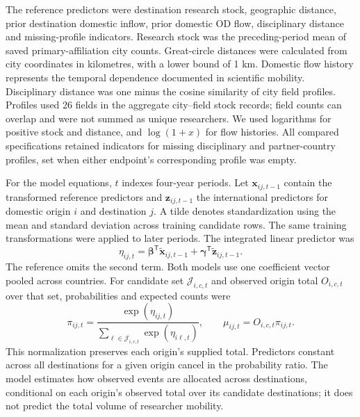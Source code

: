 The reference predictors were destination research stock, geographic distance, prior destination domestic inflow, prior domestic OD flow, disciplinary distance and missing-profile indicators. Research stock was the preceding-period mean of saved primary-affiliation city counts. Great-circle distances were calculated from city coordinates in kilometres, with a lower bound of 1 km. Domestic flow history represents the temporal dependence documented in scientific mobility\cite{ref027}. Disciplinary distance was one minus the cosine similarity of city field profiles. Profiles used 26 fields in the aggregate city--field stock records; field counts can overlap and were not summed as unique researchers. We used logarithms for positive stock and distance, and $\log(1+x)$ for flow histories. All compared specifications retained indicators for missing disciplinary and partner-country profiles, set when either endpoint's corresponding profile was empty.

For the model equations, $t$ indexes four-year periods. Let $\mathbf{x}_{ij,t-1}$ contain the transformed reference predictors and $\mathbf{z}_{ij,t-1}$ the international predictors for domestic origin $i$ and destination $j$. A tilde denotes standardization using the mean and standard deviation across training candidate rows. The same training transformations were applied to later periods. The integrated linear predictor was
\begin{equation*}
\eta_{ij,t}=\boldsymbol{\beta}^{\mathsf T}\widetilde{\mathbf{x}}_{ij,t-1}
+\boldsymbol{\gamma}^{\mathsf T}\widetilde{\mathbf{z}}_{ij,t-1}.
\end{equation*}
The reference omits the second term. Both models use one coefficient vector pooled across countries. For candidate set $\mathcal{J}_{i,c,t}$ and observed origin total $O_{i,c,t}$ over that set, probabilities and expected counts were
\begin{equation*}
\pi_{ij,t}=\frac{\exp(\eta_{ij,t})}
{\sum_{\ell\in\mathcal{J}_{i,c,t}}\exp(\eta_{i\ell,t})},\qquad
\mu_{ij,t}=O_{i,c,t}\pi_{ij,t}.
\end{equation*}
This normalization preserves each origin's supplied total. Predictors constant across all destinations for a given origin cancel in the probability ratio. The model estimates how observed events are allocated across destinations, conditional on each origin's observed total over its candidate destinations; it does not predict the total volume of researcher mobility.


